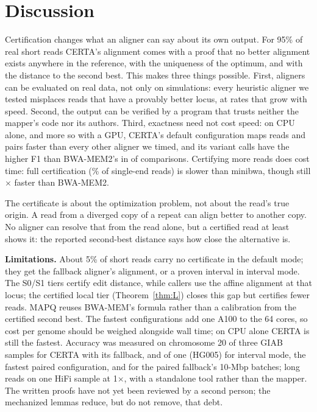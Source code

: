 \documentclass[11pt]{article}
\theoremstyle{definition}
\begin{document}
\section{Discussion}

Certification changes what an aligner can say about its own output. For
95\% of real short reads CERTA's alignment comes with a proof that no
better alignment exists anywhere in the reference, with the uniqueness of
the optimum, and with the distance to the second best. This makes three
things possible. First, aligners can be evaluated on real data, not only
on simulations: every heuristic aligner we tested misplaces reads that
have a provably better locus, at rates that grow with speed. Second, the
output can be verified by a program that trusts neither the mapper's code
nor its authors. Third, exactness need not cost speed: on CPU alone, and
more so with a GPU, CERTA's default configuration maps reads and pairs
faster than every other aligner we timed, and its variant calls have the
higher F1 than BWA-MEM2's in \PeVWins{} of \PeVComparisons{} comparisons.
Certifying more reads does cost time: full certification (\FCCertSFc\% of
single-end reads) is slower than minibwa, though still
\FCGSFcCpuXBwa$\times$ faster than BWA-MEM2.

The certificate is about the optimization problem, not about the read's
true origin. A read from a diverged copy of a repeat can align better to
another copy. No aligner can resolve that from the read alone, but a
certified read at least shows it: the reported second-best distance says
how close the alternative is.

\textbf{Limitations.} About 5\% of short reads carry no certificate in the
default mode; they get the fallback aligner's alignment, or a proven
interval in interval mode. The S0/S1 tiers certify edit distance, while
callers use the affine alignment at that locus; the certified local tier
(Theorem~\ref{thm:L}) closes this gap but certifies fewer reads. MAPQ
reuses BWA-MEM's formula rather than a calibration from the certified
second best. The fastest configurations add one A100 to the 64 cores, so
cost per genome should be weighed alongside wall time; on CPU alone CERTA
is still the fastest. Accuracy was measured on chromosome 20 of three GIAB
samples for CERTA with its fallback, and of one (HG005) for interval mode,
the fastest paired configuration, and for the paired fallback's 10-Mbp
batches; long reads on one HiFi sample at
1$\times$, with a standalone tool rather than the mapper. The written proofs have not yet been reviewed
by a second person; the mechanized lemmas reduce, but do not remove, that
debt.
\end{document}
